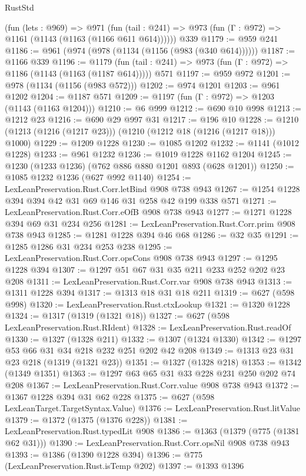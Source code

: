 \begin{lexlean}{RustStd}
\begin{coremodule}
    (fun (lets : @969) =>
    @971 (fun (tail : @241) => @973 (fun (Γ : @972) => @1161 (@1143 (@1163 (@1166 @611 @614))))))
    @339
@1179 := @959 @241
@1186 := @961 (@974 (@978 (@1134 (@1156 (@983 (@340 @614))))))
@1187 := @1166 @339
@1196 := @1179
    (fun (tail : @241) => @973 (fun (Γ : @972) => @1186 (@1143 (@1163 (@1187 @614)))))
    @571
@1197 := @959 @972
@1201 := @978 (@1134 (@1156 (@983 @572)))
@1202 := @974 @1201
@1203 := @961 @1202
@1204 := @1187 @571
@1209 := @1197 (fun (Γ : @972) => @1203 (@1143 (@1163 @1204)))
@1210 := @6 @999
@1212 := @690 @10 @998
@1213 := @1212 @23
@1216 := @690 @29 @997 @31
@1217 := @196 @10
@1228 := @1210 (@1213 (@1216 (@1217 @23))) (@1210 (@1212 @18 (@1216 (@1217 @18))) @1000)
@1229 := @1209 @1228
@1230 := @1085 @1202
@1232 := @1141 (@1012 @1228)
@1233 := @961 @1232
@1236 := @1019 @1228 @1162 @1204
@1245 := @1230 (@1233 @1236) (@762 @886 @880 @1201 @893 (@628 @1201))
@1250 := @1085 @1232 @1236 (@627 @992 @1140)
@1254 := LexLeanPreservation.Rust.Corr.letBind @908 @738 @943
@1267 := @1254 @1228 @394 @394 @42 @31 @69 @146 @31 @258 @42 @199 @338 @571
@1271 := LexLeanPreservation.Rust.Corr.eOfB @908 @738 @943
@1277 := @1271 @1228 @394 @69 @31 @234 @256
@1281 := LexLeanPreservation.Rust.Corr.prim @908 @738 @943
@1285 := @1281 @1228 @394 @46 @68
@1286 := @32 @35
@1291 := @1285 @1286 @31 @234 @253 @238
@1295 := LexLeanPreservation.Rust.Corr.opsCons @908 @738 @943
@1297 := @1295 @1228 @394
@1307 := @1297 @51 @67 @31 @35 @211 @233 @252 @202 @23 @208
@1311 := LexLeanPreservation.Rust.Corr.var @908 @738 @943
@1313 := @1311 @1228 @394
@1317 := @1313 @18 @31 @18 @211
@1319 := @627 (@598 @998)
@1320 := LexLeanPreservation.Rust.ctxLookup
@1321 := @1320 @1228
@1324 := @1317 (@1319 (@1321 @18))
@1327 := @627 (@598 LexLeanPreservation.Rust.RIdent)
@1328 := LexLeanPreservation.Rust.readOf
@1330 := @1327 (@1328 @211)
@1332 := @1307 (@1324 @1330)
@1342 := @1297 @53 @66 @31 @34 @218 @232 @251 @202 @42 @208
@1349 := @1313 @23 @31 @23 @218 (@1319 (@1321 @23))
@1351 := @1327 (@1328 @218)
@1353 := @1342 (@1349 @1351)
@1363 := @1297 @63 @65 @31 @33 @228 @231 @250 @202 @74 @208
@1367 := LexLeanPreservation.Rust.Corr.value @908 @738 @943
@1372 := @1367 @1228 @394 @31 @62 @228
@1375 := @627 (@598 LexLeanTarget.TargetSyntax.Value)
@1376 := LexLeanPreservation.Rust.litValue
@1379 := @1372 (@1375 (@1376 @228))
@1381 := LexLeanPreservation.Rust.typedLit @908
@1386 := @1363 (@1379 (@775 (@1381 @62 @31)))
@1390 := LexLeanPreservation.Rust.Corr.opsNil @908 @738 @943
@1393 := @1386 (@1390 @1228 @394)
@1396 := @775 (LexLeanPreservation.Rust.isTemp @202)
@1397 := @1393 @1396

\end{coremodule}
\end{lexlean}
